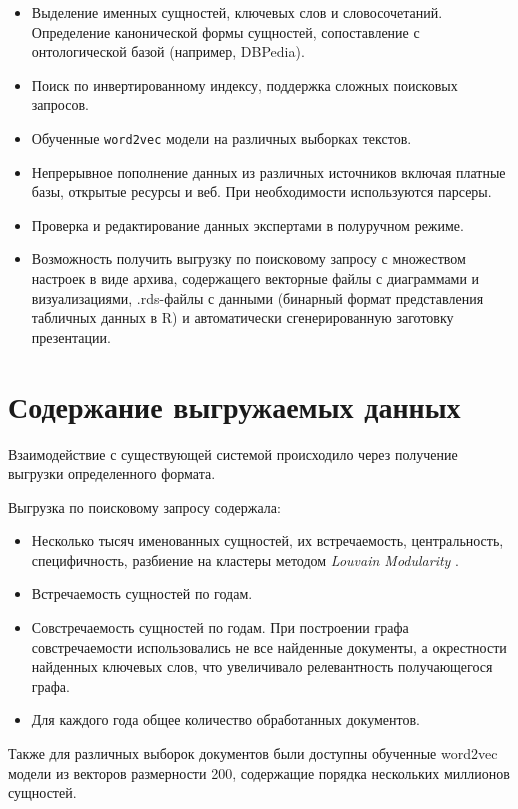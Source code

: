 \begin{itemize}
\item Выделение именных сущностей, ключевых слов и словосочетаний. Определение канонической формы сущностей, сопоставление с онтологической базой (например, DBPedia).
\item Поиск по инвертированному индексу, поддержка сложных поисковых запросов.
\item Обученные \texttt{word2vec} модели на различных выборках текстов.
\item Непрерывное пополнение данных из различных источников включая платные базы, открытые ресурсы и веб. При необходимости используются парсеры.
\item Проверка и редактирование данных экспертами в полуручном режиме.
\item Возможность получить выгрузку по поисковому запросу с множеством настроек в виде архива, содержащего векторные файлы с диаграммами и визуализациями, .rds-файлы с данными (бинарный формат представления табличных данных в R) и автоматически сгенерированную заготовку презентации.
\end{itemize}

\section{Содержание выгружаемых данных}

Взаимодействие с существующей системой происходило через получение выгрузки определенного формата.

Выгрузка по поисковому запросу содержала:

\begin{itemize}
\item Несколько тысяч именованных сущностей, их встречаемость, центральность, специфичность, разбиение на кластеры методом {\itshape Louvain Modularity} \cite{communities}.
\item Встречаемость сущностей по годам.
\item Совстречаемость сущностей по годам. При построении графа совстречаемости использовались не все найденные документы, а окрестности найденных ключевых слов, что увеличивало релевантность получающегося графа.
\item Для каждого года общее количество обработанных документов.
\end{itemize}

Также для различных выборок документов были доступны обученные word2vec модели из векторов размерности 200, содержащие порядка нескольких миллионов сущностей.

